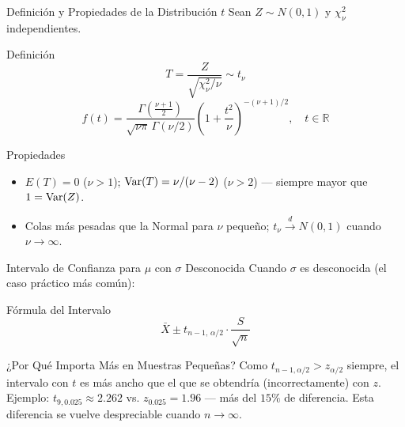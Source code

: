\documentclass[10pt, aspectratio=169]{beamer}
\begin{document}
\begin{frame}{Definición y Propiedades de la Distribución $t$}
  \footnotesize
  Sean $Z\sim N(0,1)$ y $\chi^2_\nu$ independientes. \pause

  \vspace{0.1cm}
  \begin{block}{Definición}
    $$T = \dfrac{Z}{\sqrt{\chi^2_\nu/\nu}} \sim t_\nu$$
    $$f(t) = \dfrac{\Gamma\left(\frac{\nu+1}{2}\right)}{\sqrt{\nu\pi}\,\Gamma(\nu/2)}\left(1+\dfrac{t^2}{\nu}\right)^{-(\nu+1)/2}, \quad t\in\mathbb{R}$$
  \end{block}

  \vspace{0.1cm}
  \pause
  \begin{alertblock}{Propiedades}
    \begin{itemize}\itemsep=0.05cm
      \item $E(T)=0$ ($\nu>1$); $\operatorname{Var}(T)=\nu/(\nu-2)$ ($\nu>2$) --- siempre mayor que $1=\operatorname{Var}(Z)$.
      \item Colas más pesadas que la Normal para $\nu$ pequeño; $t_\nu\xrightarrow{d}N(0,1)$ cuando $\nu\to\infty$.
    \end{itemize}
  \end{alertblock}
\end{frame}

\begin{frame}{Intervalo de Confianza para $\mu$ con $\sigma$ Desconocida}
  \footnotesize
  Cuando $\sigma$ es desconocida (el caso práctico más común): \pause

  \vspace{0.1cm}
  \begin{block}{Fórmula del Intervalo}
    $$\bar{X} \pm t_{n-1,\,\alpha/2}\cdot\dfrac{S}{\sqrt{n}}$$
  \end{block}

  \vspace{0.1cm}
  \pause
  \begin{alertblock}{¿Por Qué Importa Más en Muestras Pequeñas?}
    Como $t_{n-1,\alpha/2} > z_{\alpha/2}$ siempre, el intervalo con $t$ es más ancho que el que se obtendría (incorrectamente) con $z$. Ejemplo: $t_{9,0.025}\approx 2.262$ vs. $z_{0.025}=1.96$ --- más del $15\%$ de diferencia. Esta diferencia se vuelve despreciable cuando $n\to\infty$.
  \end{alertblock}
\end{frame}
\end{document}
